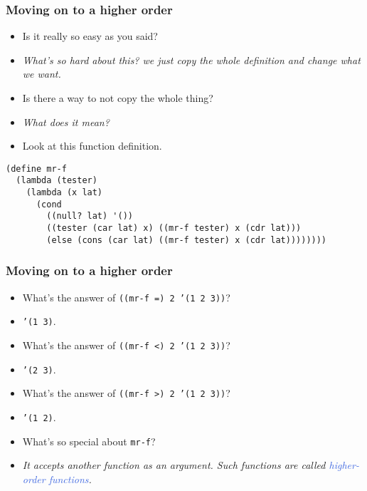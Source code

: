\begin{frame}[fragile]
  \frametitle{Moving on to a higher order}
  \begin{itemize}
    \item Is it really so easy as you said?
    \item \emph{What's so hard about this? we just copy the whole definition and change what we want.}
    \pause
    \item Is there a way to not copy the whole thing?
    \item \emph{What does it mean?}
    \pause
    \item Look at this function definition.
  \end{itemize}
  \begin{verbatim}
(define mr-f
  (lambda (tester)
    (lambda (x lat)
      (cond
        ((null? lat) '())
        ((tester (car lat) x) ((mr-f tester) x (cdr lat)))
        (else (cons (car lat) ((mr-f tester) x (cdr lat))))))))
  \end{verbatim}
\end{frame}

\begin{frame}[fragile]
  \frametitle{Moving on to a higher order}
  \begin{itemize}
    \item What's the answer of \texttt{((mr-f =) 2 '(1 2 3))}?
    \pause
    \item \texttt{'(1 3)}.
    \pause
    \item What's the answer of \texttt{((mr-f <) 2 '(1 2 3))}?
    \pause
    \item \texttt{'(2 3)}.
    \pause
    \item What's the answer of \texttt{((mr-f >) 2 '(1 2 3))}?
    \pause
    \item \texttt{'(1 2)}.
    \pause
    \item What's so special about \texttt{mr-f}?
    \pause
    \item \emph{It accepts another function as an argument. Such functions are called \textcolor{RoyalBlue}{higher-order functions}.}
  \end{itemize}
\end{frame}

